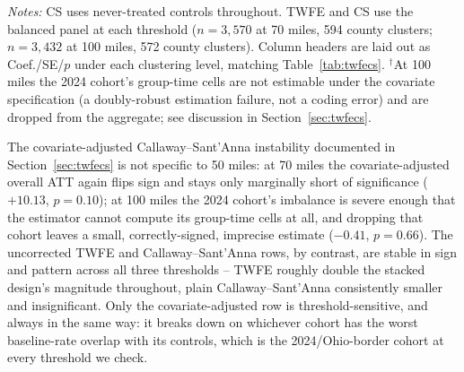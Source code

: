 \documentclass[preprint,12pt,authoryear]{elsarticle}
\begin{document}
\begin{table}[htbp]
\centering
\caption{TWFE/Callaway--Sant'Anna estimator comparison at alternative thresholds (cf.\ Table~\ref{tab:twfecs})}
\label{tab:thresh-twfecs}
\vspace{2pt}
\begin{minipage}{0.95\textwidth}
\footnotesize\emph{Notes:} CS uses never-treated controls throughout.
TWFE and CS use the balanced panel at each threshold ($n=3{,}570$ at 70
miles, 594 county clusters; $n=3{,}432$ at 100 miles, 572 county
clusters). Column headers are laid out as Coef./SE/$p$ under each
clustering level, matching Table~\ref{tab:twfecs}.
$^{\dagger}$At 100 miles the 2024 cohort's group-time cells are not
estimable under the covariate specification (a doubly-robust
estimation failure, not a coding error) and are dropped from the
aggregate; see discussion in Section~\ref{sec:twfecs}.
\end{minipage}
\end{table}

The covariate-adjusted Callaway--Sant'Anna instability documented in
Section~\ref{sec:twfecs} is not specific to 50 miles: at 70 miles the
covariate-adjusted overall ATT again flips sign and stays only
marginally short of significance ($+10.13$, $p=0.10$); at 100 miles
the 2024 cohort's imbalance is severe enough that the estimator cannot
compute its group-time cells at all, and dropping that cohort leaves a
small, correctly-signed, imprecise estimate ($-0.41$, $p=0.66$). The
uncorrected TWFE and Callaway--Sant'Anna rows, by contrast, are stable
in sign and pattern across all three thresholds -- TWFE roughly double
the stacked design's magnitude throughout, plain Callaway--Sant'Anna
consistently smaller and insignificant. Only the covariate-adjusted row
is threshold-sensitive, and always in the same way: it breaks down on
whichever cohort has the worst baseline-rate overlap with its controls,
which is the 2024/Ohio-border cohort at every threshold we check.



\end{document}

